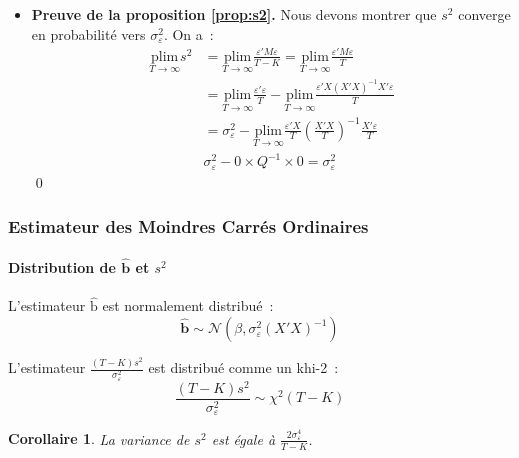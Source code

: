\documentclass[10pt]{beamer}
\theoremstyle{plain}
\newtheorem{cor}{Corollaire}
\begin{document}
\begin{notes}
\begin{itemize}
\item \textbf{Preuve de la proposition \ref{prop:s2}.} Nous devons montrer que $s^2$ converge en probabilité vers $\sigma_{\varepsilon}^2$. On a~:
  \[
    \begin{split}
      \underset{T\to\infty}{\mathrm{plim}} s^2 &= \underset{T\to\infty}{\mathrm{plim}} \frac{\varepsilon' M \varepsilon}{T-K} = \underset{T\to\infty}{\mathrm{plim}} \frac{\varepsilon' M \varepsilon}{T}\\
                                               &= \underset{T\to\infty}{\mathrm{plim}} \frac{\varepsilon' \varepsilon}{T} - \underset{T\to\infty}{\mathrm{plim}} \frac{\varepsilon' X (X'X)^{-1}X'\varepsilon}{T}\\
                                               &= \sigma_{\varepsilon}^2 - \underset{T\to\infty}{\mathrm{plim}} \frac{\varepsilon'X}{T}\left( \frac{X'X}{T} \right)^{-1}\frac{X'\varepsilon}{T}\\
      & \sigma_{\varepsilon}^2 - 0 \times Q^{-1} \times 0 = \sigma_{\varepsilon}^2
    \end{split}
  \]
\qed
\end{itemize}
\end{notes}


\begin{frame}
  \frametitle{Estimateur des Moindres Carrés Ordinaires}
  \framesubtitle {Distribution de $\hat{\mathbf b}$ et $s^2$}

  \begin{theorem}\label{thm:bhat:distribution}
    L'estimateur $\hat{\mathrm b}$ est normalement distribué~:
    \[
      \hat{\mathbf b} \sim \mathcal N\left( \beta, \sigma_{\varepsilon}^2(X'X)^{-1} \right)
    \]
  \end{theorem}


  \begin{theorem}\label{thm:s2:distribution}
    L'estimateur $\frac{(T-K)s^2}{\sigma_{\varepsilon}^2}$ est distribué comme un khi-2~:
    \[
      \frac{(T-K)s^2}{\sigma_{\varepsilon}^2} \sim \chi^2(T-K)
    \]
  \end{theorem}


  \begin{cor}\label{cor:s2:distribution}
    La variance de $s^2$ est égale à $\frac{2\sigma_{\varepsilon}^4}{T-K}$.
  \end{cor}

\end{frame}
\end{document}
